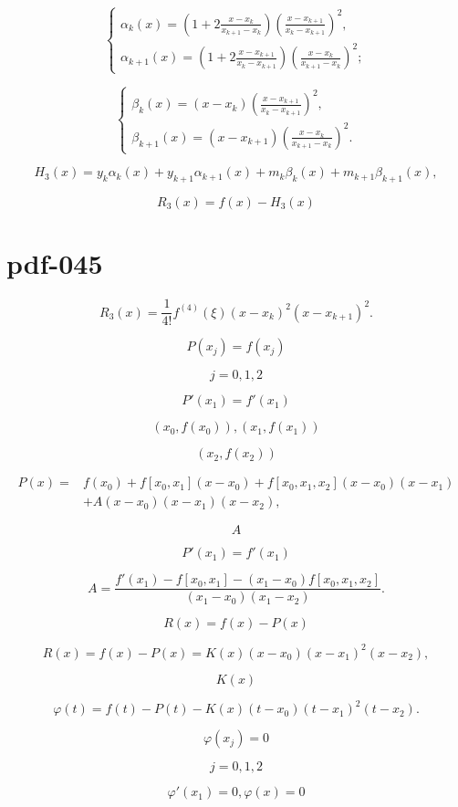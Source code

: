 \documentclass[fontset=fandol]{ctexart}
\begin{document}
\[\begin{cases}
\displaystyle\alpha_k(x)=\left(1+2\frac{x-x_k}{x_{k+1}-x_k}\right)\left(\frac{x-x_{k+1}}{x_k-x_{k+1}}\right)^2,\\[6pt]
\displaystyle\alpha_{k+1}(x)=\left(1+2\frac{x-x_{k+1}}{x_k-x_{k+1}}\right)\left(\frac{x-x_k}{x_{k+1}-x_k}\right)^2;
\end{cases}\tag{2.6.8}\]

\[\begin{cases}
\displaystyle\beta_k(x)=(x-x_k)\left(\frac{x-x_{k+1}}{x_k-x_{k+1}}\right)^2,\\[6pt]
\displaystyle\beta_{k+1}(x)=(x-x_{k+1})\left(\frac{x-x_k}{x_{k+1}-x_k}\right)^2.
\end{cases}\tag{2.6.9}\]

\[H_3(x)=y_k\alpha_k(x)+y_{k+1}\alpha_{k+1}(x)+m_k\beta_k(x)+m_{k+1}\beta_{k+1}(x),\tag{2.6.10}\]

\[R_3(x)=f(x)-H_3(x)\]

\section*{pdf-045}

\[R_3(x)=\frac{1}{4!}f^{(4)}(\xi)(x-x_k)^2(x-x_{k+1})^2.\]

\[P(x_j)=f(x_j)\]

\[j=0,1,2\]

\[P'(x_1)=f'(x_1)\]

\[(x_0,f(x_0)),(x_1,f(x_1))\]

\[(x_2,f(x_2))\]

\[\begin{aligned}
P(x)={}&f(x_0)+f[x_0,x_1](x-x_0)+f[x_0,x_1,x_2](x-x_0)(x-x_1)\\
&+A(x-x_0)(x-x_1)(x-x_2),
\end{aligned}\]

\[A\]

\[P'(x_1)=f'(x_1)\]

\[A=\frac{f'(x_1)-f[x_0,x_1]-(x_1-x_0)f[x_0,x_1,x_2]}{(x_1-x_0)(x_1-x_2)}.\]

\[R(x)=f(x)-P(x)\]

\[R(x)=f(x)-P(x)=K(x)(x-x_0)(x-x_1)^2(x-x_2),\]

\[K(x)\]

\[\varphi(t)=f(t)-P(t)-K(x)(t-x_0)(t-x_1)^2(t-x_2).\]

\[\varphi(x_j)=0\]

\[j=0,1,2\]

\[\varphi'(x_1)=0,\varphi(x)=0\]
\end{document}
